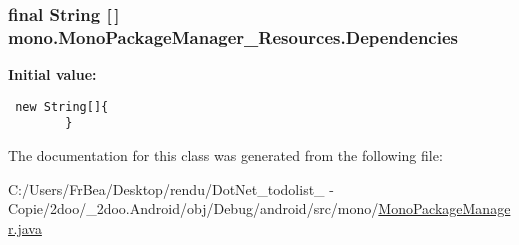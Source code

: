 \hypertarget{classmono_1_1_mono_package_manager___resources_1a4fbf906de516a47baf97dc3797c34d}{
\subsubsection[{Dependencies}]{\setlength{\rightskip}{0pt plus 5cm}final String \mbox{[}$\,$\mbox{]} {\bf mono.MonoPackageManager\_\-Resources.Dependencies}}}
\label{classmono_1_1_mono_package_manager___resources_1a4fbf906de516a47baf97dc3797c34d}


\textbf{Initial value:}

\begin{Code}\begin{verbatim} new String[]{
        }
\end{verbatim}
\end{Code}


The documentation for this class was generated from the following file:\begin{CompactItemize}
\item 
C:/Users/FrBea/Desktop/rendu/DotNet\_\-todolist\_ - Copie/2doo/\_\-2doo.Android/obj/Debug/android/src/mono/\hyperlink{_mono_package_manager_8java}{MonoPackageManager.java}\end{CompactItemize}
